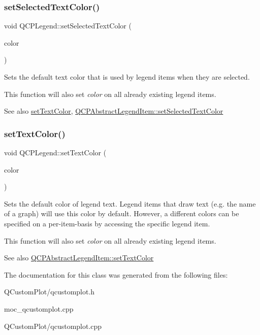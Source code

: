 \subsubsection{\texorpdfstring{set\+Selected\+Text\+Color()}{setSelectedTextColor()}}
{\footnotesize\ttfamily void Q\+C\+P\+Legend\+::set\+Selected\+Text\+Color (\begin{DoxyParamCaption}\item[{const Q\+Color \&}]{color }\end{DoxyParamCaption})}

Sets the default text color that is used by legend items when they are selected.

This function will also set {\itshape color} on all already existing legend items.

\begin{DoxySeeAlso}{See also}
\mbox{\hyperlink{class_q_c_p_legend_ae1eb239ff4a4632fe1b6c3e668d845c6}{set\+Text\+Color}}, \mbox{\hyperlink{class_q_c_p_abstract_legend_item_a4d01d008ee1a5bfe9905b0397a421936}{Q\+C\+P\+Abstract\+Legend\+Item\+::set\+Selected\+Text\+Color}} 
\end{DoxySeeAlso}
\mbox{\label{class_q_c_p_legend_ae1eb239ff4a4632fe1b6c3e668d845c6}} 
\subsubsection{\texorpdfstring{set\+Text\+Color()}{setTextColor()}}
{\footnotesize\ttfamily void Q\+C\+P\+Legend\+::set\+Text\+Color (\begin{DoxyParamCaption}\item[{const Q\+Color \&}]{color }\end{DoxyParamCaption})}

Sets the default color of legend text. Legend items that draw text (e.\+g. the name of a graph) will use this color by default. However, a different colors can be specified on a per-\/item-\/basis by accessing the specific legend item.

This function will also set {\itshape color} on all already existing legend items.

\begin{DoxySeeAlso}{See also}
\mbox{\hyperlink{class_q_c_p_abstract_legend_item_a6ebace6aaffaedcdab2d74e88acc2d1e}{Q\+C\+P\+Abstract\+Legend\+Item\+::set\+Text\+Color}} 
\end{DoxySeeAlso}


The documentation for this class was generated from the following files\+:\begin{DoxyCompactItemize}
\item 
Q\+Custom\+Plot/qcustomplot.\+h\item 
moc\+\_\+qcustomplot.\+cpp\item 
Q\+Custom\+Plot/qcustomplot.\+cpp\end{DoxyCompactItemize}
